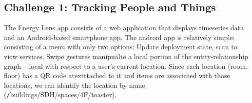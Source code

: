 




\subsection{Challenge 1: Tracking People and Things}
\label{sec:tracking}

The Energy Lens app consists of a web application that displays timeseries data and an Android-based smartphone
app.
The android app is relatively simple; consisting of a menu with only two options: Update deployment state, scan to view services.
Swipe gestures manipualte a local portion of the entity-relationship graph -- local with respect to a user's current location.
Since each location (room, floor) has a QR code atextttached to it and items are associated with those locations, we
can identify the location by name ({\texttt /buildings/SDH/spaces/4F/toaster}).  

